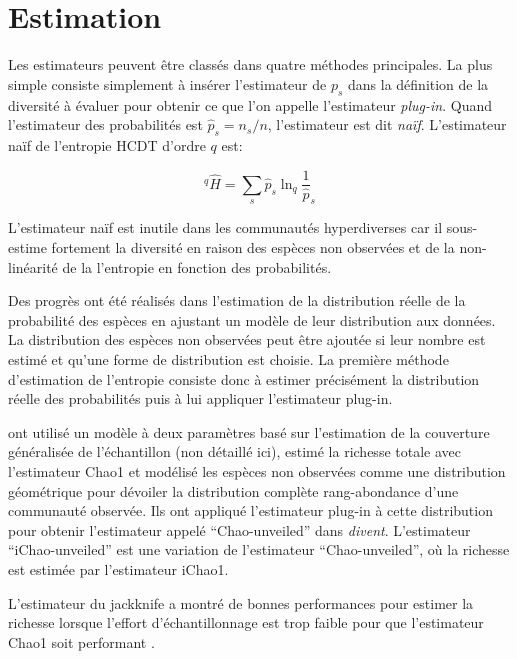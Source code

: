 \documentclass[
  11pt,
  american,
  a4paper,
  extrafontsizes,onecolumn,openright
  ]{memoir}
\newlength{\rf}
\begin{document}
\hypertarget{estimation-2}{%
\section{Estimation}\label{estimation-2}}

Les estimateurs peuvent être classés dans quatre méthodes principales.
La plus simple consiste simplement à insérer l'estimateur de \(p_s\) dans la définition de la diversité à évaluer pour obtenir ce que l'on appelle l'estimateur \emph{plug-in}.
Quand l'estimateur des probabilités est \(\hat{p}_s = n_s/n\), l'estimateur est dit \emph{naïf}.
L'estimateur naïf de l'entropie HCDT d'ordre \(q\) est:

\begin{equation}
  ^{q}{\hat{H}} = \sum_{s}{{\hat{p}}_s \ln_q{\frac{1}{\hat{p}}_s}}
  \label{eq:Hplugin}
\end{equation}

L'estimateur naïf est inutile dans les communautés hyperdiverses car il sous-estime fortement la diversité en raison des espèces non observées et de la non-linéarité de la l'entropie en fonction des probabilités.

Des progrès ont été réalisés dans l'estimation de la distribution réelle de la probabilité des espèces en ajustant un modèle de leur distribution aux données.
La distribution des espèces non observées peut être ajoutée si leur nombre est estimé et qu'une forme de distribution est choisie.
La première méthode d'estimation de l'entropie consiste donc à estimer précisément la distribution réelle des probabilités puis à lui appliquer l'estimateur plug-in.

\textcite{Chao2014c} ont utilisé un modèle à deux paramètres basé sur l'estimation de la couverture généralisée de l'échantillon (non détaillé ici), estimé la richesse totale avec l'estimateur Chao1 et modélisé les espèces non observées comme une distribution géométrique pour dévoiler la distribution complète rang-abondance d'une communauté observée.
Ils ont appliqué l'estimateur plug-in à cette distribution pour obtenir l'estimateur appelé \enquote{Chao-unveiled} dans \emph{divent}.
L'estimateur \enquote{iChao-unveiled} est une variation de l'estimateur \enquote{Chao-unveiled}, où la richesse est estimée par l'estimateur iChao1.

L'estimateur du jackknife \autocite{Burnham1979} a montré de bonnes performances pour estimer la richesse lorsque l'effort d'échantillonnage est trop faible pour que l'estimateur Chao1 soit performant \autocite{Brose2003}.
\end{document}
